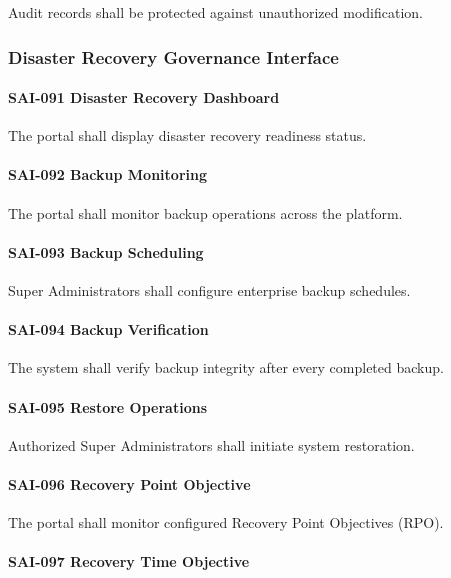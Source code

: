 Audit records shall be protected against unauthorized modification.


\subsubsection*{Disaster Recovery Governance Interface}

\paragraph{SAI-091 Disaster Recovery Dashboard}

The portal shall display disaster recovery readiness status.

\paragraph{SAI-092 Backup Monitoring}

The portal shall monitor backup operations across the platform.

\paragraph{SAI-093 Backup Scheduling}

Super Administrators shall configure enterprise backup schedules.

\paragraph{SAI-094 Backup Verification}

The system shall verify backup integrity after every completed backup.

\paragraph{SAI-095 Restore Operations}

Authorized Super Administrators shall initiate system restoration.

\paragraph{SAI-096 Recovery Point Objective}

The portal shall monitor configured Recovery Point Objectives (RPO).

\paragraph{SAI-097 Recovery Time Objective}

